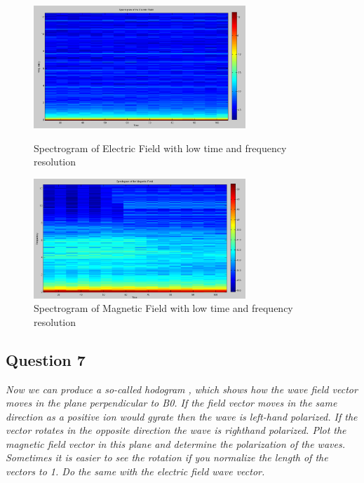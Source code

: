 \documentclass{article}
\begin{document}
\begin{figure}[ht]
\begin{minipage}[c]{0.5\linewidth}
\centering
\includegraphics[width=8cm]{Figures/spectrogram_electricLR.png}
\caption{Spectrogram of Electric Field with low time and frequency resolution}
\label{fig:spectrogram_electricLR}
\end{minipage}
\hspace{0.1cm}
\begin{minipage}[c]{0.5\linewidth}
\centering
\includegraphics[width=8cm]{Figures/spectrogram_magneticLR.png}
\caption{Spectrogram of Magnetic Field with low time and frequency resolution}
\label{fig:spectrogram_magneticLR}
\end{minipage}
\end{figure}

\subsection{Question 7}
\textit{Now we can produce a so-called hodogram , which shows how the wave field vector moves in the plane perpendicular to B0. If the field vector moves in the same direction as a positive ion would gyrate then the wave is left-hand polarized. If the vector rotates in the opposite direction the wave is righthand polarized. Plot the magnetic field vector in this plane and determine the polarization of the waves. Sometimes it is easier to see the rotation if you normalize the length of the vectors to 1. Do the same with the electric field wave vector.}

\clearpage
\end{document}
